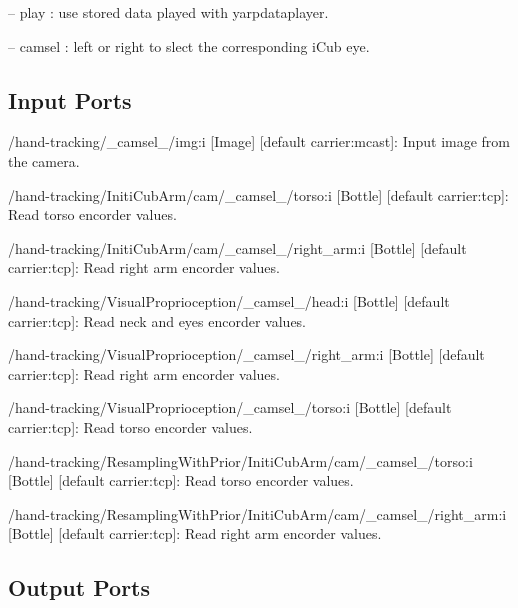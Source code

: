 \begin{DoxyItemize}
\item -- play \+: use stored data played with yarpdataplayer.
\item -- camsel \+: left or right to slect the corresponding i\+Cub eye. 
\end{DoxyItemize}\hypertarget{group__visualservoingserver_inputports_sec}{}\subsection{Input Ports}\label{group__visualservoingserver_inputports_sec}

\begin{DoxyItemize}
\item /hand-\/tracking/\+\_\+camsel\+\_\+/img\+:i \mbox{[}Image\mbox{]} \mbox{[}default carrier\+:mcast\mbox{]}\+: Input image from the camera.
\item /hand-\/tracking/\+Initi\+Cub\+Arm/cam/\+\_\+camsel\+\_\+/torso\+:i \mbox{[}Bottle\mbox{]} \mbox{[}default carrier\+:tcp\mbox{]}\+: Read torso encorder values.
\item /hand-\/tracking/\+Initi\+Cub\+Arm/cam/\+\_\+camsel\+\_\+/right\+\_\+arm\+:i \mbox{[}Bottle\mbox{]} \mbox{[}default carrier\+:tcp\mbox{]}\+: Read right arm encorder values.
\item /hand-\/tracking/\+Visual\+Proprioception/\+\_\+camsel\+\_\+/head\+:i \mbox{[}Bottle\mbox{]} \mbox{[}default carrier\+:tcp\mbox{]}\+: Read neck and eyes encorder values.
\item /hand-\/tracking/\+Visual\+Proprioception/\+\_\+camsel\+\_\+/right\+\_\+arm\+:i \mbox{[}Bottle\mbox{]} \mbox{[}default carrier\+:tcp\mbox{]}\+: Read right arm encorder values.
\item /hand-\/tracking/\+Visual\+Proprioception/\+\_\+camsel\+\_\+/torso\+:i \mbox{[}Bottle\mbox{]} \mbox{[}default carrier\+:tcp\mbox{]}\+: Read torso encorder values.
\item /hand-\/tracking/\+Resampling\+With\+Prior/\+Initi\+Cub\+Arm/cam/\+\_\+camsel\+\_\+/torso\+:i \mbox{[}Bottle\mbox{]} \mbox{[}default carrier\+:tcp\mbox{]}\+: Read torso encorder values.
\item /hand-\/tracking/\+Resampling\+With\+Prior/\+Initi\+Cub\+Arm/cam/\+\_\+camsel\+\_\+/right\+\_\+arm\+:i \mbox{[}Bottle\mbox{]} \mbox{[}default carrier\+:tcp\mbox{]}\+: Read right arm encorder values.
\end{DoxyItemize}\hypertarget{group__visualservoingserver_outputports_sec}{}\subsection{Output Ports}\label{group__visualservoingserver_outputports_sec}

